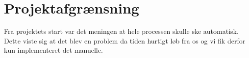 \chapter{Projektafgrænsning}
Fra projektets start var det meningen at hele processen skulle ske automatisk. Dette viste sig at det blev en problem da tiden hurtigt løb fra os og vi fik derfor kun implementeret det manuelle. 